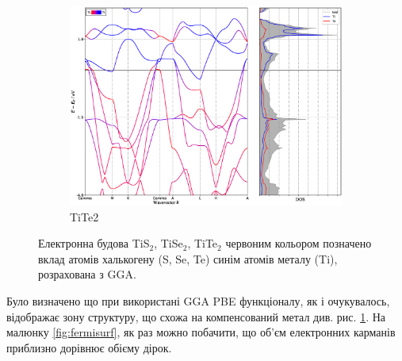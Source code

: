 \begin{figure}[H]
\begin{subfigure}[b]{.4\textwidth}
    	\includegraphics[width=\linewidth]{img/results/TiTe2_GGA_relaxed_BAND+DOS.eps}
    	\caption{
    	TiTe2}
	\end{subfigure}
\caption{Електронна будова TiS$_2$, TiSe$_2$, TiTe$_2$ червоним кольором позначено вклад атомів халькогену (S, Se, Te) синім атомів металу (Ti), розрахована з GGA.}
\label{fig:bandstructireGGA}
\end{figure}

Було визначено що при використані GGA PBE функціоналу, як і очукувалось, відображає зону структуру, що схожа на компенсований метал див. рис. \ref{fig:bandstructireGGA}. На малюнку \ref{fig:fermisurf}, як раз можно побачити, що об'єм електронних карманів приблизно дорівнює обієму дірок.

